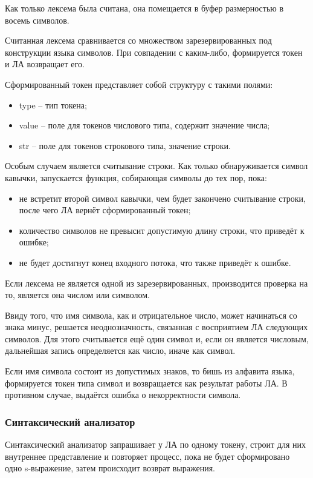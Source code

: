 Как только лексема была считана, она помещается в буфер размерностью в восемь символов.

Считанная лексема сравнивается со множеством зарезервированных под конструкции языка символов. При совпадении с каким-либо, формируется токен и ЛА возвращает его.


Сформированный токен представляет собой структуру с такими полями:
\begin{itemize}
	\item type -- тип токена;
	\item value -- поле для токенов числового типа, содержит значение числа;
	\item str -- поле для токенов строкового типа, значение строки.
\end{itemize}

Особым случаем является считывание строки. Как только обнаруживается символ кавычки, запускается функция, собирающая символы до тех пор, пока:
\begin{itemize}
	\item не встретит второй символ кавычки, чем будет закончено считывание строки, после чего ЛА вернёт сформированный токен;
	\item количество символов не превысит допустимую длину строки, что приведёт к ошибке;
	\item не будет достигнут конец входного потока, что также приведёт к ошибке.
\end{itemize}


Если лексема не является одной из зарезервированных, производится проверка на то, является она числом или символом.

Ввиду того, что имя символа, как и отрицательное число, может начинаться со знака минус, решается неоднозначность, связанная с восприятием ЛА следующих символов. Для этого считывается ещё один символ и, если он является числовым, дальнейшая запись определяется как число, иначе как символ.

Если имя символа состоит из допустимых знаков, то бишь из алфавита языка, формируется токен типа символ и возвращается как результат работы ЛА. В противном случае, выдаётся ошибка о некорректности символа.

\subsubsection{Синтаксический анализатор}
Синтаксический анализатор запрашивает у ЛА по одному токену, строит для них внутреннее представление и повторяет процесс, пока не будет сформировано одно s-выражение, затем происходит возврат выражения.

